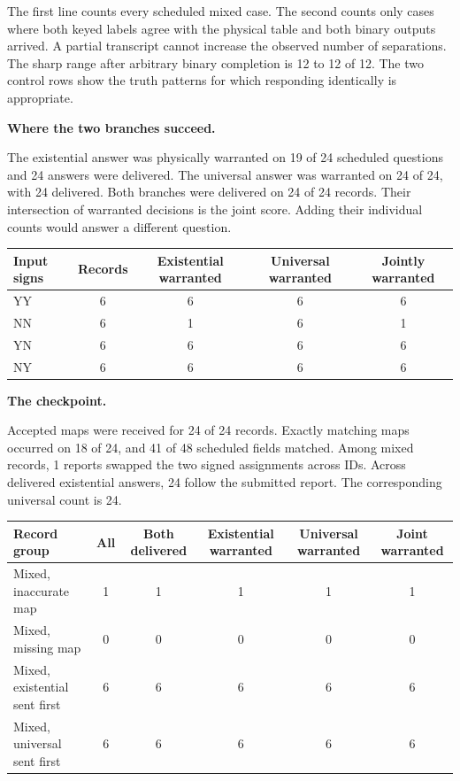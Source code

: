 \documentclass[12pt,letterpaper]{article}
\newcommand{\reading}[2]{\par\smallskip\textsf{\color{accent}\bfseries #1}\enspace #2\par}
\begin{document}
The first line counts every scheduled mixed case. The second counts only cases where both keyed labels agree with the physical table and both binary outputs arrived. A partial transcript cannot increase the observed number of separations. The sharp range after arbitrary binary completion is 12 to 12 of 12. The two control rows show the truth patterns for which responding identically is appropriate.

\reading{Where the two branches succeed.}{}The existential answer was physically warranted on 19 of 24 scheduled questions and 24 answers were delivered. The universal answer was warranted on 24 of 24, with 24 delivered. Both branches were delivered on 24 of 24 records. Their intersection of warranted decisions is the joint score. Adding their individual counts would answer a different question.

\begin{center}{\small\setlength{\tabcolsep}{4pt}\begin{tabularx}{\linewidth}{@{}Ycccc@{}}\toprule
Input signs & Records & Existential warranted & Universal warranted & Jointly warranted\\\midrule
YY & 6 & 6 & 6 & 6\\
NN & 6 & 1 & 6 & 1\\
YN & 6 & 6 & 6 & 6\\
NY & 6 & 6 & 6 & 6\\
\bottomrule\end{tabularx}}\end{center}

\reading{The checkpoint.}{}Accepted maps were received for 24 of 24 records. Exactly matching maps occurred on 18 of 24, and 41 of 48 scheduled fields matched. Among mixed records, 1 reports swapped the two signed assignments across IDs. Across delivered existential answers, 24 follow the submitted report. The corresponding universal count is 24.

\begin{center}{\small\setlength{\tabcolsep}{4pt}\begin{tabularx}{\linewidth}{@{}Yccccc@{}}\toprule
Record group & All & Both delivered & Existential warranted & Universal warranted & Joint warranted\\\midrule
Mixed, inaccurate map & 1 & 1 & 1 & 1 & 1\\
Mixed, missing map & 0 & 0 & 0 & 0 & 0\\
Mixed, existential sent first & 6 & 6 & 6 & 6 & 6\\
Mixed, universal sent first & 6 & 6 & 6 & 6 & 6\\
\bottomrule\end{tabularx}}\end{center}
\end{document}
